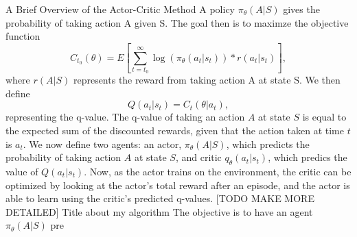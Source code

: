 \documentclass[a4paper]{article}
\begin{document}
\large 
A Brief Overview of the Actor-Critic Method\linebreak
\normalsize
A policy $\pi_\theta(A|S)$ gives the probability of taking action A given S.\linebreak
The goal then is to maximze the objective function 
$$C_{t_0}(\theta) = E[\sum_{t=t_0}^{\infty} \log(\pi_\theta(a_t|s_t)) * r(a_t|s_t)],$$
where $r(A|S)$ represents the reward from taking action A at state S. We then define 
$$Q(a_t|s_t) = C_{t}(\theta|a_t),$$
representing the q-value. The q-value of taking an action $A$ at state $S$ is equal to the expected sum of the discounted rewards, 
given that the action taken at time $t$ is $a_t$.
We now define two agents: an actor, $\pi_\theta(A|S)$, which predicts the probability of taking action $A$ at state $S$, and critic $q_\theta(a_t|s_t)$,
which predics the value of $Q(a_t|s_t)$. Now, as the actor trains on the environment, the critic can be optimized by looking at the actor's total reward after an episode,
and the actor is able to learn using the critic's predicted q-values. [TODO MAKE MORE DETAILED]\linebreak
\large
Title about my algorithm
\normalsize
The objective is to have an agent $\pi_\theta(A|S)$ pre
\end{document}
